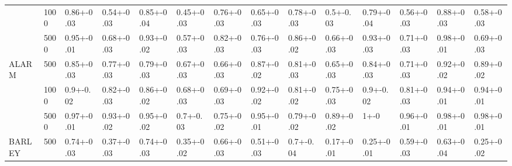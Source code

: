 \documentclass{svmult}
\begin{document}
\begin{landscape}
\begin{center}
{\begin{tabular}{llllllllllllll}
           & 1000    & 0.86+-0.03                    & 0.54+-0.03                 & 0.85+-0.04                    & 0.45+-0.03                 & 0.76+-0.03                    & 0.65+-0.03                 & 0.78+-0.03                    & 0.5+-0.03                  & 0.79+-0.04                    & 0.56+-0.03                 & 0.88+-0.03                    & 0.58+-0.03                 \\
           & 5000    & 0.95+-0.01                    & 0.68+-0.03                 & 0.93+-0.02                    & 0.57+-0.03                 & 0.82+-0.03                    & 0.76+-0.03                 & 0.86+-0.02                    & 0.66+-0.03                 & 0.93+-0.03                    & 0.71+-0.03                 & 0.98+-0.01                    & 0.69+-0.03                 \\ \hline
ALARM      & 500     & 0.85+-0.03                    & 0.77+-0.03                 & 0.79+-0.03                    & 0.67+-0.03                 & 0.66+-0.03                    & 0.87+-0.02                 & 0.81+-0.03                    & 0.65+-0.03                 & 0.84+-0.03                    & 0.71+-0.03                 & 0.92+-0.02                    & 0.89+-0.02                 \\
           & 1000    & 0.9+-0.02                     & 0.82+-0.03                 & 0.86+-0.02                    & 0.68+-0.03                 & 0.69+-0.03                    & 0.92+-0.02                 & 0.81+-0.02                    & 0.75+-0.03                 & 0.9+-0.02                     & 0.81+-0.03                 & 0.94+-0.01                    & 0.94+-0.01                 \\
           & 5000    & 0.97+-0.01                    & 0.93+-0.02                 & 0.95+-0.02                    & 0.7+-0.03                  & 0.75+-0.02                    & 0.95+-0.01                 & 0.79+-0.02                    & 0.89+-0.02                 & 1+-0                          & 0.96+-0.01                 & 0.98+-0.01                    & 0.98+-0.01                 \\ \hline
BARLEY     & 500     & 0.74+-0.03                    & 0.37+-0.03                 & 0.74+-0.03                    & 0.35+-0.02                 & 0.66+-0.03                    & 0.51+-0.03                 & 0.7+-0.04                            & 0.17+-0.01                         & 0.25+-0.01                            & 0.59+-0.03                         & 0.63+-0.04                    & 0.25+-0.02                 \\

\end{tabular}}
\end{center}
\end{landscape}
\end{document}
